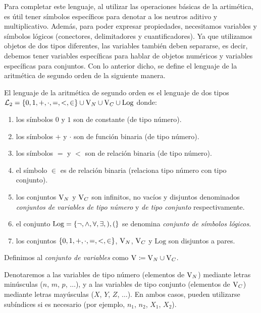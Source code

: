Para completar este lenguaje, al utilizar las operaciones básicas de la artimética, es útil tener símbolos específicos para denotar a los neutros aditivo y multiplicativo. Además, para poder expresar propiedades, necesitamos variables y símbolos lógicos (conectores, delimitadores y cuantificadores). Ya que utilizamos objetos de dos tipos diferentes, las variables también deben separarse, es decir, debemos tener variables específicas para hablar de objetos numéricos y variables específicas para conjuntos. Con lo anterior dicho, se define el lenguaje de la aritmética de segundo orden de la siguiente manera.

\begin{definition}
	El lenguaje de la aritmética de segundo orden es el lenguaje de dos tipos $\ARITMETICA =\set*{0, 1, +,\cdot, =, <,\in}\cup\VARIABLES[N]\cup\VARIABLES[C]\cup\mathrm{Log}$ donde:

	\begin{enumerate}
		\item los símbolos $0$ y $1$ son de constante (de tipo número).
		\item los símbolos $+$ y $\cdot$ son de función binaria (de tipo número).
		\item los símbolos $=$ y $<$ son de relación binaria (de tipo número).
		\item el símbolo $\in$ es de relación binaria (relaciona tipo número con tipo conjunto).
		\item los conjuntos $\VARIABLES[N]$ y $\VARIABLES[C]$ son infinitos, no vacíos y disjuntos denominados \emph{conjuntos de variables de tipo número} y \emph{de tipo conjunto} respectivamente.
		\item el conjunto $\mathrm{Log} =\set*{\neg,\land,\forall,\exists, ), (}$ se denomina \emph{conjunto de símbolos lógicos}.
		\item los conjuntos $\set*{0, 1, +,\cdot, =, <,\in}$, $\VARIABLES[N]$, $\VARIABLES[C]$ y $\mathrm{Log}$ son disjuntos a pares.
	\end{enumerate}

	Definimos al \emph{conjunto de variables} como $\VARIABLES\coloneqq\VARIABLES[N]\cup\VARIABLES[C]$.
\end{definition}


\begin{notation}
	Denotaremos a las variables de tipo número (elementos de $\VARIABLES[N]$) mediante letras minúsculas ($n$, $m$, $p$, $\dotsc$), y a las variables de tipo conjunto (elementos de $\VARIABLES[C]$) mediante letras mayúsculas ($X$, $Y$, $Z$, $\dotsc$). En ambos casos, pueden utilizarse subíndices si es necesario (por ejemplo, $n_{1}$, $n_{2}$, $X_{1}$, $X_{2}$).
\end{notation}


